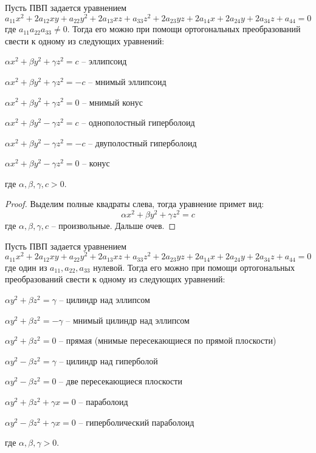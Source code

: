 \begin{Thm}
	Пусть ПВП задается уравнением
	\[a_{11} x^2 + 2a_{12} xy + a_{22} y^2 + 2a_{13} xz + a_{33} z^2 + 2a_{23} yz + 2a_{14} x + 2a_{24} y + 2a_{34} z + a_{44} = 0\]
	где $a_{11} a_{22} a_{33} \neq 0$. Тогда его можно при помощи ортогональных преобразований свести к одному из следующих уравнений:

	\begin{MyList}
		\item $\alpha x^2 + \beta y^2 + \gamma z^2 = c$ -- эллипсоид
		\item $\alpha x^2 + \beta y^2 + \gamma z^2 = -c$ -- мнимый эллипсоид
		\item $\alpha x^2 + \beta y^2 + \gamma z^2 = 0$ -- мнимый конус
		\item $\alpha x^2 + \beta y^2 - \gamma z^2 = c$ -- однополостный гиперболоид 
		\item $\alpha x^2 + \beta y^2 - \gamma z^2 = -c$ -- двуполостный гиперболоид
		\item $\alpha x^2 + \beta y^2 - \gamma z^2 = 0$ -- конус
	\end{MyList}
	где $\alpha, \beta, \gamma, c > 0$.
\end{Thm}

\begin{proof}
	Выделим полные квадраты слева, тогда уравнение примет вид:
	\[\alpha x^2 + \beta y^2 + \gamma z^2 = c\]
	где $\alpha, \beta, \gamma, c$ -- произвольные. Дальше очев.
\end{proof}

\begin{figure}[H]
	\centering
	\def\svgwidth{\columnwidth}
	
\end{figure}

\begin{Thm}
	Пусть ПВП задается уравнением
	\[a_{11} x^2 + 2a_{12} xy + a_{22} y^2 + 2a_{13} xz + a_{33} z^2 + 2a_{23} yz + 2a_{14} x + 2a_{24} y + 2a_{34} z + a_{44} = 0\]
	где один из $a_{11}, a_{22}, a_{33}$ нулевой. Тогда его можно при помощи ортогональных преобразований свести к одному из следующих уравнений:

	\begin{MyList}
		\item $\alpha y^2 + \beta z^2 = \gamma$ -- цилиндр над эллипсом
		\item $\alpha y^2 + \beta z^2 = - \gamma$ -- мнимый цилиндр над эллипсом
		\item $\alpha y^2 + \beta z^2 = 0$ -- прямая (мнимые пересекающиеся по прямой плоскости)
		\item $\alpha y^2 - \beta z^2 = \gamma$ -- цилиндр над гиперболой
		\item $\alpha y^2 - \beta z^2 = 0$ -- две пересекающиеся плоскости
		\item $\alpha y^2 + \beta z^2 + \gamma x = 0$ -- параболоид
		\item $\alpha y^2 - \beta z^2 + \gamma x = 0$ -- гиперболический параболоид
	\end{MyList}
	где $\alpha, \beta, \gamma > 0$.
\end{Thm}

